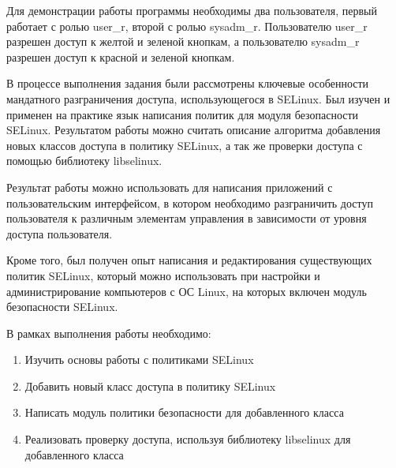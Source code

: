 \documentclass{./../class/UIR}
\begin{document}
	Для демонстрации работы программы необходимы два пользователя, первый работает
	с ролью user\_r, второй с ролью sysadm\_r. Пользователю user\_r разрешен доступ
	к желтой и зеленой кнопкам, а пользователю sysadm\_r разрешен доступ к красной
	и зеленой кнопкам.
	
	
    В процессе выполнения задания были рассмотрены ключевые особенности
    мандатного разграничения доступа, использующегося в SELinux. Был изучен и
    применен на практике язык написания политик для модуля безопасности
    SELinux. Результатом работы можно считать описание алгоритма добавления
    новых классов доступа в политику SELinux, а так же проверки доступа с
    помощью библиотеку libselinux.

    Результат работы можно использовать для написания приложений с
    пользовательским интерфейсом, в котором необходимо разграничить доступ
    пользователя к различным элементам управления в зависимости от уровня
    доступа пользователя.

    Кроме того, был получен опыт написания и редактирования существующих политик
    SELinux, который можно использовать при настройки и администрирование
    компьютеров с ОС Linux, на которых включен модуль безопасности SELinux.


\begin{ReviewOfSupervisor}

\end{ReviewOfSupervisor} 


\begin{TaskOfStudent}
В рамках выполнения работы необходимо:
\begin{enumerate}
  \item Изучить основы работы с политиками SELinux
  \item Добавить новый класс доступа в политику SELinux
  \item Написать модуль политики безопасности для добавленного класса
  \item Реализовать проверку доступа, используя библиотеку libselinux для
  добавленного класса
\end{enumerate}
\end{TaskOfStudent}
\end{document}
